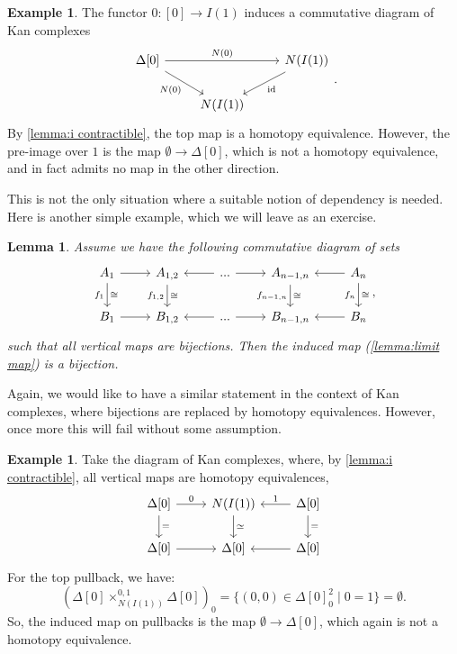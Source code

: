 \documentclass[11pt, a4paper]{amsart}
\newcommand{\id}{\mathrm{id}}
\newtheorem{lemma}[equation]{Lemma}
\theoremstyle{definition}
\newtheorem{example}[equation]{Example}
\theoremstyle{remark}
\numberwithin{equation}{section}
\begin{document}
\begin{example} \label{ex:preimage fail}
   The functor $0\colon [0] \to I(1)$ induces a commutative diagram of Kan complexes
  \[ 
   \begin{tikzcd}
    \Delta[0] \arrow[rr, "N(0)"] \arrow[dr, "N(0)"'] & & N(I(1)) \arrow[dl, "\id"] \\
    & N(I(1))
   \end{tikzcd}.
  \]
  By \cref{lemma:i contractible}, the top map is a homotopy equivalence. However, the pre-image over $1$ is the map $\emptyset \to \Delta[0]$, which is not a homotopy equivalence, and in fact admits no map in the other direction.
\end{example}

This is not the only situation where a suitable notion of dependency is needed. Here is another simple example, which we will leave as an exercise.

\begin{lemma} \label{lemma:pullback invariance}
  Assume we have the following commutative diagram of sets
  \[ 
  \begin{tikzcd}
   A_1 \arrow[r] \arrow[d, "\cong", "f_1"'] & A_{1,2} \arrow[d, "\cong", "f_{1,2}"'] & ... \arrow[r] \arrow[l] & A_{n-1,n} \arrow[d, "\cong", "f_{n-1,n}"'] & A_n \arrow[d, "\cong", "f_n"'] \arrow[l] \\ 
   B_1 \arrow[r] & B_{1,2} & ... \arrow[r] \arrow[l] & B_{n-1,n} & B_n \arrow[l]
  \end{tikzcd},
  \]
  such that all vertical maps are bijections. Then the induced map (\cref{lemma:limit map}) is a bijection.
\end{lemma}

Again, we would like to have a similar statement in the context of Kan complexes, where bijections are replaced by homotopy equivalences. However, once more this will fail without some assumption.

\begin{example} \label{ex:pullback invariance fail}
  Take the diagram of Kan complexes, where, by \cref{lemma:i contractible}, all vertical maps are homotopy equivalences,
  \[ 
  \begin{tikzcd}
   \Delta[0] \arrow[r, "0"] \arrow[d, "="] & N(I(1)) \arrow[d, "\simeq"] & \Delta[0] \arrow[d, "="] \arrow[l, "1"'] \\ 
   \Delta[0] \arrow[r] & \Delta[0] & \Delta[0] \arrow[l]
  \end{tikzcd}
  \]
  For the top pullback, we have:
  \[(\Delta[0] \times_{N(I(1))}^{0,1} \Delta[0])_0 = \{(0,0) \in \Delta[0]_0^2 \mid 0 = 1 \} = \emptyset.\]
  So, the induced map on pullbacks is the map $\emptyset \to \Delta[0]$, which again is not a homotopy equivalence.
\end{example}
\end{document}
